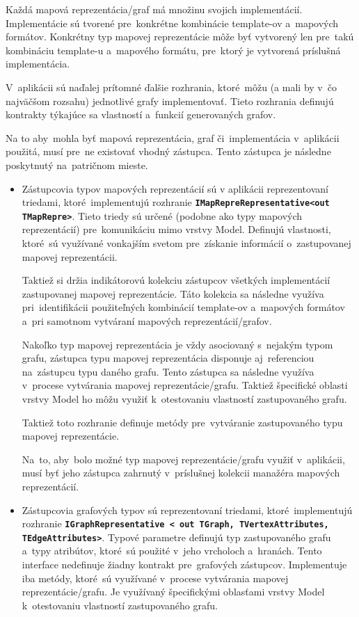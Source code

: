 Každá mapová reprezentácia/graf má množinu svojich implementácií. Implementácie sú tvorené pre~konkrétne kombinácie template-ov a~mapových formátov. Konkrétny typ mapovej reprezentácie môže byť vytvorený len pre~takú kombináciu template-u a~mapového formátu, pre~ktorý je vytvorená príslušná implementácia.

V~aplikácii sú naďalej prítomné ďalšie rozhrania, ktoré~môžu (a mali by v~čo najväčšom rozsahu) jednotlivé grafy implementovať. Tieto rozhrania definujú kontrakty týkajúce sa vlastností a~funkcií generovaných grafov.

\bigskip

Na to aby~mohla byť mapová reprezentácia, graf či~implementácia v~aplikácii použitá, musí pre~ne existovať vhodný zástupca. Tento zástupca je následne poskytnutý na~patričnom mieste.
\begin{itemize}
    \item Zástupcovia typov mapových reprezentácií sú v aplikácii reprezentovaní triedami, ktoré~implementujú rozhranie \textbf{\texttt{IMapRepreRepresentative<out TMapRepre>}}. Tieto triedy sú určené (podobne ako typy mapových reprezentácií) pre~komunikáciu mimo vrstvy Model. Definujú vlastnosti, ktoré~sú využívané vonkajším svetom pre~získanie informácií o~zastupovanej mapovej reprezentácii. 
    
    Taktiež si držia indikátorovú kolekciu zástupcov všetkých implementácií zastupovanej mapovej reprezentácie. Táto kolekcia sa následne využíva pri~identifikácii použiteľných kombinácií template-ov a~mapových formátov a~pri samotnom vytváraní mapových reprezentácií/grafov.
    
    Nakoľko typ mapovej reprezentácia je vždy asociovaný s~nejakým typom grafu, zástupca typu mapovej reprezentácia disponuje aj~referenciou na~zástupcu typu daného grafu. Tento zástupca sa následne využíva v~procese vytvárania mapovej reprezentácie/grafu. Taktiež špecifické oblasti vrstvy Model ho môžu využiť k~otestovaniu vlastností zastupovaného grafu.

    Taktiež toto rozhranie definuje metódy pre~vytváranie zastupovaného typu mapovej reprezentácie. 

    Na~to, aby~bolo možné typ mapovej reprezentácie/grafu využiť v~aplikácii, musí byť jeho zástupca zahrnutý v~príslušnej kolekcii manažéra mapových reprezentácií.

    \item Zástupcovia grafových typov sú reprezentovaní triedami, ktoré~implementujú rozhranie \textbf{\texttt{IGraphRepresentative < out TGraph, TVertexAttributes, TEdgeAttributes>}}. Typové parametre definujú typ zastupovaného grafu a~typy atribútov, ktoré~sú použité v~jeho vrcholoch a~hranách. Tento interface nedefinuje žiadny kontrakt pre~grafových zástupcov. Implementuje iba metódy, ktoré~sú využívané v~procese vytvárania mapovej reprezentácie/grafu. Je využívaný špecifickými oblasťami vrstvy Model k~otestovaniu vlastností zastupovaného grafu.


\end{itemize}
